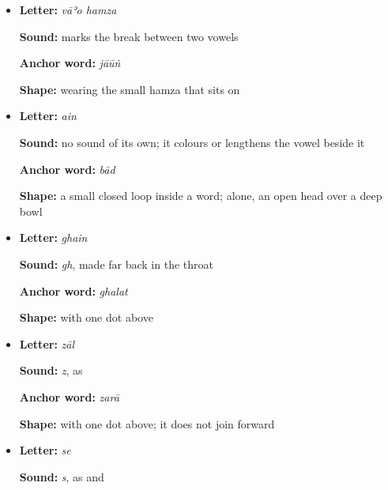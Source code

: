 \begin{itemize}
\raggedright
\setlength{\itemsep}{0.35em}
  \item \begin{minipage}[t]{\linewidth}
  \textbf{Letter:} \textbf{} \emph{vāʾo hamza}
  \par \textbf{Sound:} marks the break between two vowels
  \par \textbf{Anchor word:} \textbf{} \emph{jāūṅ}
  \par \textbf{Shape:} \textbf{} wearing the small hamza that sits on \textbf{}
  \end{minipage}
  \item \begin{minipage}[t]{\linewidth}
  \textbf{Letter:} \textbf{} \emph{ain}
  \par \textbf{Sound:} no sound of its own; it colours or lengthens the vowel beside it
  \par \textbf{Anchor word:} \textbf{} \emph{bād}
  \par \textbf{Shape:} a small closed loop inside a word; alone, an open head over a deep bowl
  \end{minipage}
  \item \begin{minipage}[t]{\linewidth}
  \textbf{Letter:} \textbf{} \emph{ghain}
  \par \textbf{Sound:} \emph{gh}, made far back in the throat
  \par \textbf{Anchor word:} \textbf{} \emph{ghalat}
  \par \textbf{Shape:} \textbf{} with one dot above
  \end{minipage}
  \item \begin{minipage}[t]{\linewidth}
  \textbf{Letter:} \textbf{} \emph{zāl}
  \par \textbf{Sound:} \emph{z}, as \textbf{} \textbf{} \textbf{}
  \par \textbf{Anchor word:} \textbf{} \emph{zarā}
  \par \textbf{Shape:} \textbf{} with one dot above; it does not join forward
  \end{minipage}
  \item \begin{minipage}[t]{\linewidth}
  \textbf{Letter:} \textbf{} \emph{se}
  \par \textbf{Sound:} \emph{s}, as \textbf{} and \textbf{}

\end{minipage}
\end{itemize}
